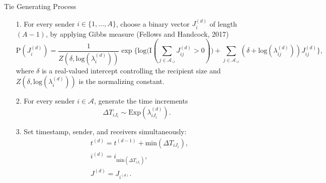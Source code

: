 \documentclass[10pt]{beamer}
\theoremstyle{definition}
\theoremstyle{remark}
\begin{document}
\begin{frame}{Tie Generating Process}
	\begin{itemize}
		\item[1.] For every sender $i \in \{1,...,A\}$, choose a binary vector $J^{(d)}_i$ of length $(A-1)$, by applying Gibbs measure (Fellows and Handcock, 2017) 
		\footnotesize\begin{equation} \text{P}(J_i^{(d)}) = \frac{1}{Z(\delta,\mbox{log}(\lambda_i^{(d)}))} \exp\Big\{ \mbox{log}\big(\text{I}( \sum_{j \in \mathcal{A}_{\backslash i}} J^{(d)}_{ij} > 0 )\big) + \sum_{j \in \mathcal{A}_{\backslash i}} (\delta+\mbox{log}(\lambda_{ij}^{(d)}))J_{ij}^{(d)} \Big\},
		\end{equation}
		\normalsize
		where $\delta$ is a real-valued intercept controlling the recipient size and  $Z(\delta,\mbox{log}(\lambda_i^{(d)}))$ is the normalizing constant.\vspace{0.4cm}
		\item[2.] For every sender $i \in \mathcal{A}$, generate the time increments 
	\footnotesize	\begin{equation*}
		\Delta T_{i{J_i}} \sim \mbox{Exp}(\lambda_{i{J_i}}^{(d)}).
		\end{equation*}\normalsize
		\item[3.] Set timestamp, sender, and receivers simultaneously:
	\footnotesize	\begin{equation*}
		\begin{aligned}
		&t^{(d)} = t^{(d-1)}+\mbox{min}(\Delta T_{i{J_i}}),\\
		&i^{(d)} = i_{\mbox{min}(\Delta T_{i{J_i}})}, \\
		&J^{(d)} = J_{i^{(d)}}.
		\end{aligned}
		\end{equation*}
		\normalsize
		\end{itemize}
\end{frame}
\end{document}
